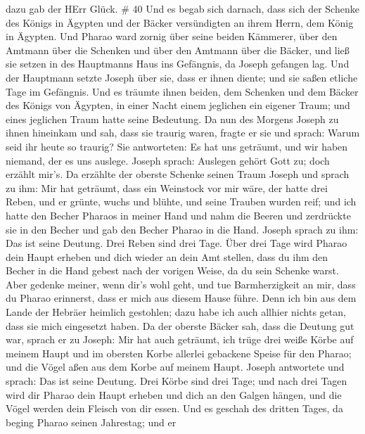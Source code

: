 dazu gab der HErr Glück. \# 40  Und es begab sich darnach,
dass sich der Schenke des Königs in Ägypten und der Bäcker versündigten
an ihrem Herrn, dem König in Ägypten.  Und Pharao ward
zornig über seine beiden Kämmerer, über den Amtmann über die Schenken
und über den Amtmann über die Bäcker,  und ließ sie setzen
in des Hauptmanns Haus ins Gefängnis, da Joseph gefangen lag.
 Und der Hauptmann setzte Joseph über sie, dass er ihnen
diente; und sie saßen etliche Tage im Gefängnis.  Und es
träumte ihnen beiden, dem Schenken und dem Bäcker des Königs von
Ägypten, in einer Nacht einem jeglichen ein eigener Traum; und eines
jeglichen Traum hatte seine Bedeutung.  Da nun des Morgens
Joseph zu ihnen hineinkam und sah, dass sie traurig waren, 
fragte er sie und sprach: Warum seid ihr heute so traurig? 
Sie antworteten: Es hat uns geträumt, und wir haben niemand, der es uns
auslege. Joseph sprach: Auslegen gehört Gott zu; doch erzählt mir's.
 Da erzählte der oberste Schenke seinen Traum Joseph und
sprach zu ihm: Mir hat geträumt, dass ein Weinstock vor mir wäre,
 der hatte drei Reben, und er grünte, wuchs und blühte, und
seine Trauben wurden reif;  und ich hatte den Becher
Pharaos in meiner Hand und nahm die Beeren und zerdrückte sie in den
Becher und gab den Becher Pharao in die Hand.  Joseph
sprach zu ihm: Das ist seine Deutung. Drei Reben sind drei Tage.
 Über drei Tage wird Pharao dein Haupt erheben und dich
wieder an dein Amt stellen, dass du ihm den Becher in die Hand gebest
nach der vorigen Weise, da du sein Schenke warst.  Aber
gedenke meiner, wenn dir's wohl geht, und tue Barmherzigkeit an mir,
dass du Pharao erinnerst, dass er mich aus diesem Hause führe.
 Denn ich bin aus dem Lande der Hebräer heimlich gestohlen;
dazu habe ich auch allhier nichts getan, dass sie mich eingesetzt haben.
 Da der oberste Bäcker sah, dass die Deutung gut war,
sprach er zu Joseph: Mir hat auch geträumt, ich trüge drei weiße Körbe
auf meinem Haupt  und im obersten Korbe allerlei gebackene
Speise für den Pharao; und die Vögel aßen aus dem Korbe auf meinem
Haupt.  Joseph antwortete und sprach: Das ist seine
Deutung. Drei Körbe sind drei Tage;  und nach drei Tagen
wird dir Pharao dein Haupt erheben und dich an den Galgen hängen, und
die Vögel werden dein Fleisch von dir essen.  Und es
geschah des dritten Tages, da beging Pharao seinen Jahrestag; und er
